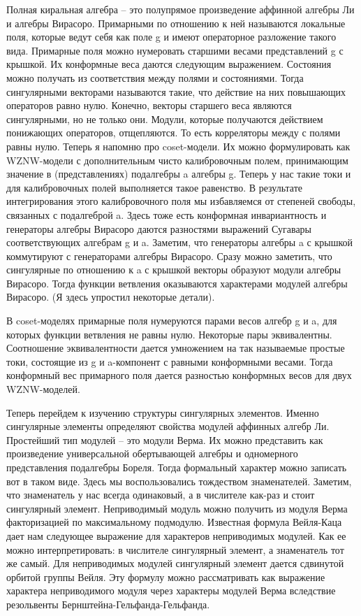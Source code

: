 \documentclass{article}
\theoremstyle{definition} \newtheorem{Def}{Определение}
\begin{document}
Полная киральная алгебра -- это полупрямое произведение аффинной алгебры Ли и алгебры Вирасоро. Примарными по отношению к ней называются локальные поля, которые ведут себя как поле g и имеют операторное разложение такого вида. 
Примарные поля можно нумеровать старшими весами представлений g с крышкой. Их конформные веса даются следующим выражением. 
Состояния можно получать из соответствия между полями и состояниями. Тогда сингулярными векторами называются такие, что действие на них повышающих операторов равно нулю. Конечно, векторы старшего веса являются сингулярными, но не только они. Модули, которые получаются действием понижающих операторов, отщепляются. То есть корреляторы между с полями равны нулю. 
Теперь я напомню про coset-модели. Их можно формулировать как WZNW-модели с дополнительным чисто калибровочным полем, принимающим значение в (представлениях) подалгебры a алгебры g. Теперь у нас такие токи и для калибровочных полей выполняется такое равенство.  В результате интегрирования этого калибровочного поля мы избавляемся от степеней свободы, связанных с подалгеброй a. Здесь тоже есть конформная инвариантность и генераторы алгебры Вирасоро даются разностями выражений Сугавары соответствующих алгебрам g и a. 
Заметим, что генераторы алгебры a  с крышкой коммутируют с генераторами алгебры Вирасоро. Сразу можно заметить, что сингулярные по отношению к a с крышкой векторы образуют модули алгебры Вирасоро. Тогда функции ветвления оказываются характерами модулей алгебры Вирасоро. (Я здесь упростил некоторые детали).

В coset-моделях примарные поля нумеруются парами весов алгебр g и a, для которых функции ветвления не равны нулю. Некоторые пары эквивалентны. Соотношение эквивалентности дается умножением на так называемые простые токи, состоящие из g и a-компонент с равными конформными весами. Тогда конформный вес примарного поля дается разностью конформных весов для двух WZNW-моделей. 

Теперь перейдем к изучению структуры сингулярных элементов. Именно сингулярные элементы определяют свойства модулей аффинных алгебр Ли. 
Простейший тип модулей -- это модули Верма. Их можно представить как произведение универсальной обертывающей алгебры и одномерного представления подалгебры Бореля. Тогда формальный характер можно записать вот в таком виде. Здесь мы воспользовались тождеством знаменателей. Заметим, что знаменатель у нас всегда одинаковый, а в числителе как-раз и стоит сингулярный элемент. Неприводимый модуль можно получить из модуля Верма факторизацией по максимальному подмодулю. Известная формула Вейля-Каца дает нам следующее выражение для характеров неприводимых модулей. Как ее можно интерпретировать: в числителе сингулярный элемент, а знаменатель тот же самый. Для неприводимых модулей сингулярный элемент дается сдвинутой орбитой группы Вейля. Эту формулу можно рассматривать как выражение характера неприводимого модуля через характеры модулей Верма вследствие резольвенты Бернштейна-Гельфанда-Гельфанда. 
\end{document}
